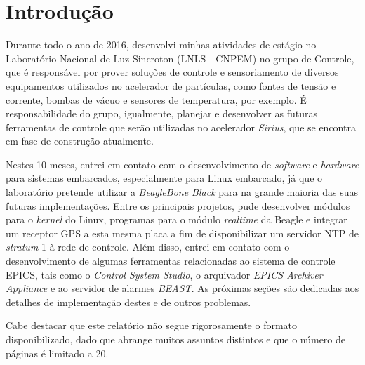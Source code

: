 \section {Introdução}

Durante todo o ano de 2016, desenvolvi minhas atividades de
estágio no Laboratório Nacional de Luz Sincroton (LNLS - CNPEM) no grupo de Controle, que
é responsável por prover soluções de controle e sensoriamento de diversos
equipamentos utilizados no acelerador de partículas, como fontes de tensão e
corrente, bombas de vácuo e sensores de temperatura, por exemplo. É
responsabilidade do grupo, igualmente, planejar e desenvolver as futuras
ferramentas de controle que serão utilizadas no acelerador \textit{Sirius}, que
se encontra em fase de construção atualmente.

\vspace{12pt}

Nestes 10 meses, entrei em contato com o desenvolvimento
de \textit{software} e \textit{hardware} para sistemas embarcados, especialmente
para Linux embarcado, já que o laboratório pretende utilizar a
\textit{BeagleBone Black} para na grande maioria das suas futuras
implementações.
Entre os principais projetos, pude desenvolver módulos para o \textit{kernel} do Linux, programas
para o módulo \textit{realtime} da Beagle e integrar um receptor GPS a esta
mesma placa a fim de disponibilizar um servidor NTP de \textit{stratum} 1 à
rede de controle. Além disso, entrei em contato com o desenvolvimento de
algumas ferramentas relacionadas ao sistema de controle EPICS, tais como o
\textit{Control System Studio}, o arquivador \textit{EPICS Archiver Appliance}
e ao servidor de alarmes \textit{BEAST}. As próximas seções são dedicadas aos
detalhes de implementação destes e de outros problemas.

\vspace{12pt}

Cabe destacar que este relatório não segue rigorosamente o formato
disponibilizado, dado que abrange muitos assuntos distintos e que o número de
páginas é limitado a 20.

\newpage
